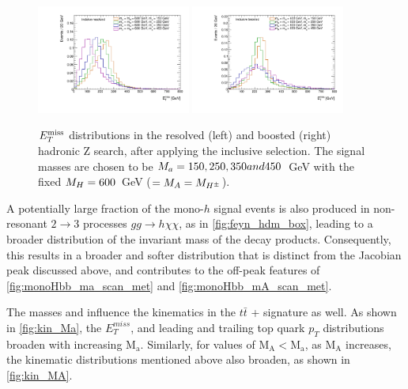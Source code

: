 \begin{figure}
\centering

\includegraphics[width=0.45\textwidth]{texinputs/04_grid/figures/monoz/hadronic/mA600_incl_resl_MET_linear.pdf}
\includegraphics[width=0.45\textwidth]{texinputs/04_grid/figures/monoz/hadronic/mA600_incl_merged_MET_linear.pdf}
\caption{$E_T^\mathrm{miss}$ distributions in the resolved (left) and boosted (right) hadronic Z search, after applying the inclusive selection. 
The signal masses are chosen to be $M_{a} = 150, 250, 350 and 450$~GeV with the fixed $M_{H} = 600$~GeV ($= M_{A} = M_{H^{\pm}}$).
\label{fig:monozhad_kin_inc_fixed_mA}}

\end{figure}

A potentially large fraction of the mono-$h$ signal events is also produced in non-resonant $2 \to 3$ processes $gg \to h \chi \chi$, as in \autoref{fig:feyn_hdm_box}, leading to a broader distribution of the invariant mass of the decay products. 
Consequently, this results in a broader and softer \met distribution that is distinct from the Jacobian peak discussed above, 
and contributes to the off-peak features of \autoref{fig:monoHbb_ma_scan_met} and \autoref{fig:monoHbb_mA_scan_met}. 

The masses \ma and \mA influence the kinematics in the $t\bar{t}$ + \MET signature as well. As shown in \autoref{fig:kin_Ma}, the $E_{T}^{miss}$, and leading and trailing top quark $p_{T}$ distributions broaden with increasing $\mathrm{M_{a}}$. 
Similarly, for values of $\mathrm{M_{A}} < \mathrm{M_{a}}$, as $\mathrm{M_{A}}$ increases, the kinematic distributions mentioned above also broaden, as shown in \autoref{fig:kin_MA}.


